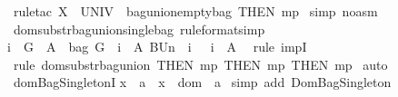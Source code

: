 \begin{isabellebody}
%
\isadelimproof
%
\endisadelimproof
%
\isatagproof
{}\isamarkupfalse%
\ {\isacharparenleft}rule{\isacharunderscore}tac\ X{}\ {\isacharequal}\ {\isachardoublequoteopen}UNIV{\isachardoublequoteclose}\ \ bagunion{\isacharunderscore}emptybag{}\ {\isacharbrackleft}THEN\ mp{\isacharbrackright}{\isacharparenright}\isanewline
{}\isamarkupfalse%
\ {\isacharparenleft}simp\ {\isacharparenleft}no{\isacharunderscore}asm{\isacharparenright}{\isacharparenright}\isanewline
{}\isamarkupfalse%
%
\endisatagproof
{\isafoldproof}%
%
\isadelimproof
\isanewline
%
\endisadelimproof
\isanewline
{}\isamarkupfalse%
\ domsubstr{\isacharunderscore}bagunion{\isacharunderscore}singlebag\ {\isacharbrackleft}rule{\isacharunderscore}format{\isacharcomma}simp{\isacharbrackright}{\isacharcolon}\ \isanewline
{\isachardoublequoteopen}{\isacharparenleft}i\ {\isacharcolon}\ G{\isacharparenright}\ {\isacharminus}{\isacharminus}{\isachargreater}\ A\ {\isacharcolon}\ bag\ G\ {\isacharminus}{\isacharminus}{\isachargreater}\ {\isacharparenleft}{\isacharbraceleft}i{\isacharbraceright}\ {\isacharless}{\isacharminus}{\isacharcolon}\ {\isacharparenleft}A\ BUn\ {\isacharpercent}{\isacharbrackleft}\ i\ {\isacharpercent}{\isacharbrackright}{\isacharparenright}{\isacharparenright}\ {\isacharequal}\ {\isacharparenleft}{\isacharbraceleft}i{\isacharbraceright}\ {\isacharless}{\isacharminus}{\isacharcolon}\ A{\isacharparenright}{\isachardoublequoteclose}\isanewline
%
\isadelimproof
%
\endisadelimproof
%
\isatagproof
{}\isamarkupfalse%
\ \ {\isacharparenleft}rule\ impI{\isacharparenright}{\isacharplus}\isanewline
{}\isamarkupfalse%
\ {\isacharparenleft}rule\ domsubstr{\isacharunderscore}bagunion\ {\isacharbrackleft}THEN\ mp{\isacharcomma}\ THEN\ mp{\isacharcomma}\ THEN\ mp{\isacharbrackright}{\isacharparenright}\isanewline
{}\isamarkupfalse%
\ auto\isanewline
{}\isamarkupfalse%
%
\endisatagproof
{\isafoldproof}%
%
\isadelimproof
\isanewline
%
\endisadelimproof
\isanewline
\isanewline
{}\isamarkupfalse%
\ dom{\isacharunderscore}BagSingleton{\isacharunderscore}I{\isacharcolon}\isanewline
{\isachardoublequoteopen}{\isacharbrackleft}{\isacharbar}x\ {\isacharequal}\ a{\isacharbar}{\isacharbrackright}\ {\isacharequal}{\isacharequal}{\isachargreater}\ x\ {\isacharcolon}\ dom\ {\isacharparenleft}{\isacharpercent}{\isacharbrackleft}\ a\ {\isacharpercent}{\isacharbrackright}{\isacharparenright}{\isachardoublequoteclose}\isanewline
%
\isadelimproof
%
\endisadelimproof
%
\isatagproof
{}\isamarkupfalse%
{\isacharparenleft}simp\ add{\isacharcolon}\ DomBagSingleton{\isacharparenright}%
\endisatagproof
{\isafoldproof}%
%
\isadelimproof
\isanewline
%
\endisadelimproof
\isanewline
\isanewline
%
\isadelimtheory
\isanewline
%
\endisadelimtheory
%
\isatagtheory
{}\isamarkupfalse%
%
\endisatagtheory
{\isafoldtheory}%
%
\isadelimtheory
\isanewline
%
\endisadelimtheory
\isanewline
\isanewline
\end{isabellebody}%
